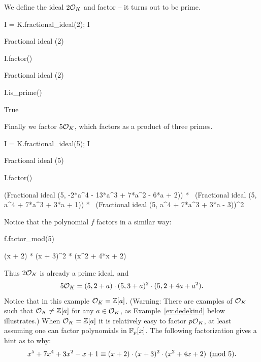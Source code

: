 \par\noindent{}We define the ideal $2\mathcal{O}_K$ and factor -- it turns
out to be prime.
\begin{sagecode}
\begin{sagecell}
I = K.fractional_ideal(2); I
\end{sagecell}
\begin{sageout}
Fractional ideal (2)
\end{sageout}
\begin{sagecell}
I.factor()
\end{sagecell}
\begin{sageout}
Fractional ideal (2)
\end{sageout}
\begin{sagecell}
I.is_prime()
\end{sagecell}
\begin{sageout}
True
\end{sageout}
\end{sagecode} %

\par\noindent{}Finally we factor $5\mathcal{O}_K$, which factors as a product of three
primes.
\begin{sagecode}
\begin{sagecell}
I = K.fractional_ideal(5); I
\end{sagecell}
\begin{sageout}
Fractional ideal (5)
\end{sageout}
\begin{sagecell}
I.factor()
\end{sagecell}
\begin{sageout}
(Fractional ideal (5, -2*a^4 - 13*a^3 + 7*a^2 - 6*a + 2)) * \
(Fractional ideal (5, a^4 + 7*a^3 + 3*a + 1)) * \
(Fractional ideal (5, a^4 + 7*a^3 + 3*a - 3))^2
\end{sageout}
\end{sagecode} %
Notice that the polynomial $f$ factors in a similar way:
\begin{sagecode} %
\begin{sagecell}
f.factor_mod(5)
\end{sagecell}
\begin{sageout}
(x + 2) * (x + 3)^2 * (x^2 + 4*x + 2)
\end{sageout}
\end{sagecode}
Thus $2\mathcal{O}_K$ is already a prime ideal, and
$$
  5\mathcal{O}_K = (5,2+a)\cdot(5,3+a)^2\cdot(5,2+4a+a^2).
$$
Notice that in this example $\mathcal{O}_K=\mathbb{Z}[a]$.  (Warning: There are
examples of $\mathcal{O}_K$ such that $\mathcal{O}_K\neq \mathbb{Z}[a]$ for any $a\in\mathcal{O}_K$, as
Example~\ref{ex:dedekind} below illustrates.)  When $\mathcal{O}_K=\mathbb{Z}[a]$ it is
relatively easy to factor $p\mathcal{O}_K$, at least assuming one can factor
polynomials in $\mathbb{F}_p[x]$.  The following
factorization gives a hint as to why:
$$
  x^5+7x^4+3x^2-x+1 \equiv (x+2)\cdot (x+3)^2 \cdot (x^2+4x+2)\pmod{5}.
$$


